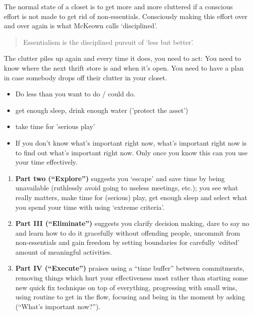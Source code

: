 \documentclass[11pt,a4paper]{article}
\begin{document}
\begin{paracol}{2}

The normal state of a closet is to get more and more cluttered if a conscious effort is not made to get rid of non-essentials. Consciously making this effort over and over again is what McKeown calls ‘disciplined’. 

\begin{quote}
    Essentialism is the disciplined pursuit of ‘less but better’.
\end{quote}

The clutter piles up again and every time it does, you need to act: You need to know where the next thrift store is and when it’s open. You need to have a plan in case somebody drops off their clutter in your closet.


\begin{itemize}
    \item Do less than you want to do / could do. 
    \item get enough sleep, drink enough water ('protect the asset')
    \item take time for 'serious play'
    \item If you don't know what’s important right now, what’s important right now is to find out what’s important right now. Only once you know this can you use your time effectively.
\end{itemize}

\begin{enumerate}
    \item 
    \textbf{Part two (“Explore”)} suggests you ‘escape’ and save time by being unavailable (ruthlessly avoid going to useless meetings, etc.); you see what really matters, make time for (serious) play, get enough sleep and select what you spend your time with using ‘extreme criteria’. 
    \item \textbf{Part III (“Eliminate”)} suggests you clarify decision making, dare to say no and learn how to do it gracefully without offending people, uncommit from non-essentials and gain freedom by setting boundaries for carefully ‘edited’ amount of meaningful activities.
    \item \textbf{Part IV (“Execute”)} praises using a “time buffer” between commitments, removing things which hurt your effectiveness most rather than starting some new quick fix technique on top of everything, progressing with small wins, using routine to get in the flow, focusing and being in the moment by asking (“What’s important now?”).
\end{enumerate}



\end{paracol}
\end{document}
